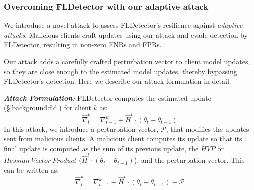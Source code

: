 \subsubsection{Overcoming FLDetector with our adaptive attack}\label{impact:attacks:fld}
We introduce a novel attack to assess FLDetector's resilience against \emph{adaptive attacks}. Malicious clients craft updates using our attack and evade detection by FLDetector, resulting in non-zero FNRs and FPRs.

Our attack adds a carefully crafted perturbation vector to client model updates, so they are close enough to the estimated model updates, thereby bypassing FLDetector's detection. Here we describe our attack formulation in detail.



\noindent\textbf{\em Attack Formulation:}
FLDetector computes the estimated update (\S\ref{background:fld}) for client $k$ as:
\begin{equation}\label{eqn:fld_update}
    \hat{\nabla}_{t}^{k} = \nabla_{t-1}^{k} + \hat{H}^{t}\cdot(\theta_{t} - \theta_{t-1})
\end{equation}
In this attack, we introduce a perturbation vector, $\mathcal{P}$, that modifies the updates sent from malicious clients. A malicious client computes its update so that its final update is computed as the sum of its previous update, the $HVP$ or $Hessian\ Vector\ Product$ ($\hat{H}^{t}\cdot(\theta_{t} - \theta_{t-1})$), and the perturbation vector. This can be written as:
\begin{equation}\label{eqn:fld_mal_update}
    \hat{\nabla}_{t}^{k} = \nabla_{t-1}^{k} + \hat{H}^{t}\cdot(\theta_{t} - \theta_{t-1}) + \mathcal{P}
\end{equation}

